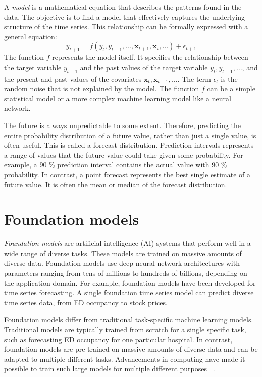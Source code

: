 A \emph{model} is a mathematical equation that describes the patterns found in the data. The objective is to find a model that effectively captures the underlying structure of the time series. 
This relationship can be formally expressed with a general equation:
\begin{equation}
y_{t+1} = f(y_{t}, y_{t-1}, \dots, \mathbf{x}_{t+1}, \mathbf{x}_{t}, \dots) + \epsilon_{t+1}
\end{equation}
The function $f$ represents the model itself. It specifies the relationship between the target variable $y_{t+1}$ and the past values of the target variable $y_{t}, y_{t-1}, \dots$,
and the present and past values of the covariates $\mathbf{x}_{t}, \mathbf{x}_{t-1}, \dots$.
The term $\epsilon_t$ is the random noise that is not explained by the model.
The function $f$ can be a simple statistical model or a more complex machine learning model like a neural network. ~\cite{hyndman2018forecasting}

The future is always unpredictable to some extent. Therefore, predicting the entire probability distribution of a future value, rather than just a single value, is often useful. This is called a forecast distribution.
Prediction intervals represents a range of values that the future value could take given some probability. For example, a 90 \% prediction interval contains the actual value with 90 \% probability.
In contrast, a point forecast represents the best single estimate of a future value. It is often the mean or median of the forecast distribution. ~\cite{hyndman2018forecasting}

\section{Foundation models}

\emph{Foundation models} are artificial intelligence (AI) systems that perform well in a wide range of diverse tasks. These models are trained on massive amounts of diverse data. Foundation models use deep neural network architectures with parameters ranging from tens of millions to hundreds of billions, depending on the application domain. For example, foundation models have been developed for time series forecasting. A single foundation time series model can predict diverse time series data, from ED occupancy to stock prices. ~\cite{bommasani2022opportunitiesrisksfoundationmodels}

Foundation models differ from traditional task-specific machine learning models. Traditional models are typically trained from scratch for a single specific task, such as forecasting ED occupancy for one particular hospital. In contrast, foundation models are pre-trained on massive amounts of diverse data and can be adapted to multiple different tasks. Advancements in computing have made it possible to train such large models for multiple different purposes ~\cite{bommasani2022opportunitiesrisksfoundationmodels}. 

